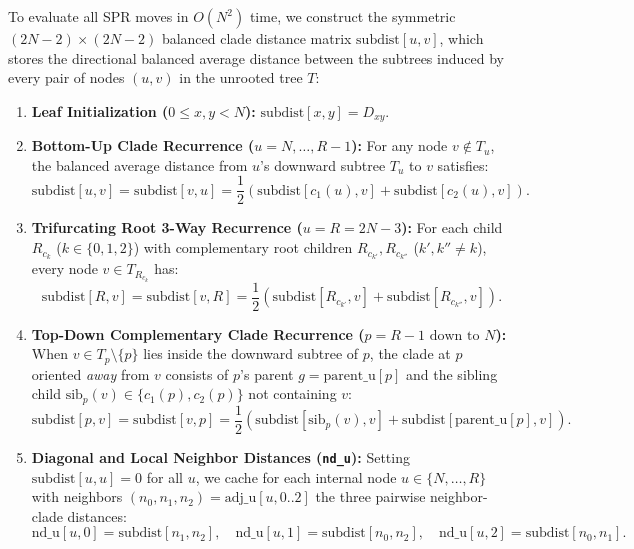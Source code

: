\documentclass[11pt,a4paper]{article}
\theoremstyle{definition}
\begin{document}
To evaluate all SPR moves in $O(N^2)$ time, we construct the symmetric $(2N-2) \times (2N-2)$ balanced clade distance matrix $\text{subdist}[u, v]$, which stores the directional balanced average distance between the subtrees induced by every pair of nodes $(u, v)$ in the unrooted tree $T$:
\begin{enumerate}
    \item \textbf{Leaf Initialization ($0 \le x, y < N$):} $\text{subdist}[x, y] = D_{xy}$.
    \item \textbf{Bottom-Up Clade Recurrence ($u = N, \dots, R-1$):} For any node $v \notin T_u$, the balanced average distance from $u$'s downward subtree $T_u$ to $v$ satisfies:
    \begin{equation}
    \text{subdist}[u, v] = \text{subdist}[v, u] = \frac{1}{2}\left(\text{subdist}[c_1(u), v] + \text{subdist}[c_2(u), v]\right).
    \label{eq:bottom_up}
    \end{equation}
    \item \textbf{Trifurcating Root 3-Way Recurrence ($u = R = 2N-3$):} For each child $R_{c_k}$ ($k \in \{0, 1, 2\}$) with complementary root children $R_{c_{k'}}, R_{c_{k''}}$ ($k', k'' \neq k$), every node $v \in T_{R_{c_k}}$ has:
    \begin{equation}
    \text{subdist}[R, v] = \text{subdist}[v, R] = \frac{1}{2}\left(\text{subdist}[R_{c_{k'}}, v] + \text{subdist}[R_{c_{k''}}, v]\right).
    \label{eq:root_3way}
    \end{equation}
    \item \textbf{Top-Down Complementary Clade Recurrence ($p = R-1 \text{ down to } N$):} When $v \in T_p \setminus \{p\}$ lies inside the downward subtree of $p$, the clade at $p$ oriented \emph{away} from $v$ consists of $p$'s parent $g = \text{parent\_u}[p]$ and the sibling child $\text{sib}_p(v) \in \{c_1(p), c_2(p)\}$ not containing $v$:
    \begin{equation}
    \text{subdist}[p, v] = \text{subdist}[v, p] = \frac{1}{2}\left(\text{subdist}[\text{sib}_p(v), v] + \text{subdist}[\text{parent\_u}[p], v]\right).
    \label{eq:top_down}
    \end{equation}
    \item \textbf{Diagonal and Local Neighbor Distances (\texttt{nd\_u}):} Setting $\text{subdist}[u, u] = 0$ for all $u$, we cache for each internal node $u \in \{N, \dots, R\}$ with neighbors $(n_0, n_1, n_2) = \text{adj\_u}[u, 0..2]$ the three pairwise neighbor-clade distances:
    \begin{equation}
    \text{nd\_u}[u, 0] = \text{subdist}[n_1, n_2], \quad \text{nd\_u}[u, 1] = \text{subdist}[n_0, n_2], \quad \text{nd\_u}[u, 2] = \text{subdist}[n_0, n_1].
    \end{equation}
\end{enumerate}
\end{document}
